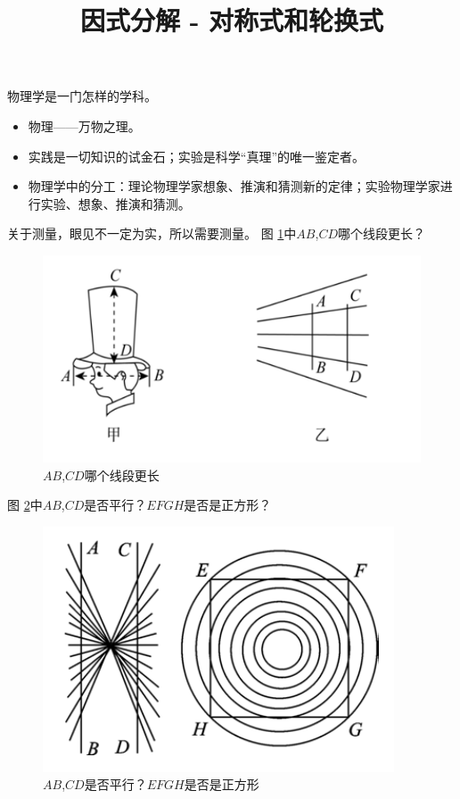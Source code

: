 \documentclass[windows,csize4]{BHCexam}
\title{因式分解 - 对称式和轮换式}
\begin{document}
\maketitle

\begin{groups}
    物理学是一门怎样的学科。
    \begin{itemize}
        \item 物理——万物之理。
        \item 实践是一切知识的试金石；实验是科学“真理”的唯一鉴定者。
        \item 物理学中的分工：理论物理学家想象、推演和猜测新的定律；实验物理学家进行实验、想象、推演和猜测。
    \end{itemize}
    
    关于测量，眼见不一定为实，所以需要测量。
    图 \ref{fig:fig_1_1}中$AB$,$CD$哪个线段更长？
    \begin{figure}[htb]
        \centering
        \includegraphics [scale=0.75,trim=0 0 0 0]{./image/fig_1_1.PNG}
        \caption{$AB$,$CD$哪个线段更长} 
        \label{fig:fig_1_1}
    \end{figure}

    图 \ref{fig:fig_1_2}中$AB$,$CD$是否平行？$EFGH$是否是正方形？
    \begin{figure}[htb]
        \centering
        \includegraphics [scale=0.75,trim=0 0 0 0]{./image/fig_1_2.PNG}
        \caption{$AB$,$CD$是否平行？$EFGH$是否是正方形} 
        \label{fig:fig_1_2}
    \end{figure}


\end{groups}
\end{document}
